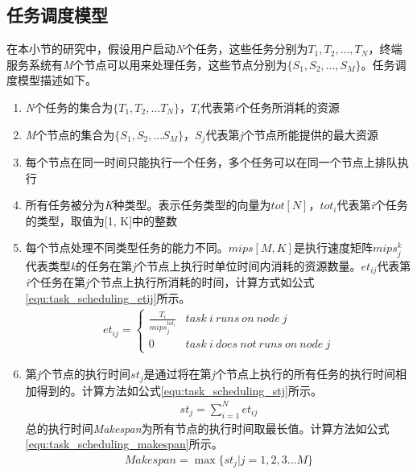 \subsection{任务调度模型}
在本小节的研究中，假设用户启动\emph{N}个任务，这些任务分别为${T_1,T_2,...,T_N}$，终端服务系统有\emph{M}个节点可以用来处理任务，这些节点分别为$\{S_1,S_2,...,S_M\}$。任务调度模型描述如下。
\begin{enumerate}[]
    \item \emph{N}个任务的集合为$\{T_1,T_2,...T_N\}$，$T_i$代表第\emph{i}个任务所消耗的资源
    \item \emph{M}个节点的集合为$\{S_1,S_2,...S_M\}$，$S_j$代表第\emph{j}个节点所能提供的最大资源
    \item 每个节点在同一时间只能执行一个任务，多个任务可以在同一个节点上排队执行
    \item 所有任务被分为\emph{K}种类型。表示任务类型的向量为$tot[N]$，$tot_i$代表第\emph{i}个任务的类型，取值为[1, K]中的整数
    \item 每个节点处理不同类型任务的能力不同。$mips[M,K]$是执行速度矩阵$mips_{j}^{k}$ 代表类型\emph{k}的任务在第\emph{j}个节点上执行时单位时间内消耗的资源数量。$et_{ij}$代表第\emph{i}个任务在第\emph{j}个节点上执行所消耗的时间，计算方式如公式\ref{equ:task_scheduling_etij}所示。
    \begin{eqnarray}\label{equ:task_scheduling_etij}
        et_{ij}= \begin{cases}
            \frac{T_i}{mips_{j}^{tot_i}} & task\  i\  runs\  on\  node\  j \\
            0&task\  i\  does\  not\  runs\  on\  node\  j 
            \end{cases} 
    \end{eqnarray}
    \item 第\emph{j}个节点的执行时间$st_j$是通过将在第\emph{j}个节点上执行的所有任务的执行时间相加得到的。计算方法如公式\ref{equ:task_scheduling_stj}所示。
    \begin{eqnarray}\label{equ:task_scheduling_stj}
        st_{j}=\sum_{i=1}^{N} et_{ij}
    \end{eqnarray}
    总的执行时间\emph{Makespan}为所有节点的执行时间取最长值。计算方法如公式\ref{equ:task_scheduling_makespan}所示。
    \begin{eqnarray}\label{equ:task_scheduling_makespan}
        Makespan=\max\{st_j | j=1,2,3...M\}

\end{eqnarray}
\end{enumerate}
